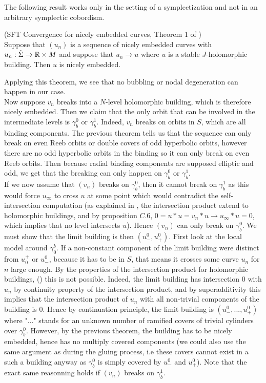 \documentclass[../main.tex]{subfiles}
\begin{document}
\noindent The following result works only in the setting of a symplectization and not in an arbitrary symplectic cobordism.

\begin{theoreme}{(SFT Convergence for nicely embedded curves, Theorem 1 of \cite{wendl_compactness_2008})\\}
    Suppose that $(u_n)$ is a sequence of nicely embedded curves with $u_n : \dot\Sigma \rightarrow \mathbb{R}\times M$ and suppose that $u_n\rightarrow u$ where $u$ is a stable $J$-holomorphic building. Then $u$ is nicely embedded.
\end{theoreme}

Applying this theorem, we see that no bubbling or nodal degeneration can happen in our case. \\

Now suppose $v_n$ breaks into a $N$-level holomorphic building, which is therefore nicely embedded. Then we claim that the only orbit that can be involved in the intermediate levels is $\gamma_b^0$ or $\gamma_b^1$. Indeed, $v_n$ breaks on orbits in $\overline{S}$, which are all binding components. The previous theorem tells us that the sequence can only break on even Reeb orbits or double covers of odd hyperbolic orbits, however there are no odd hyperbolic orbits in the binding so it can only break on even Reeb orbits. Then because radial binding components are supposed elliptic and odd, we get that the breaking can only happen on $\gamma_b^0$ or $\gamma_b^1$. \\

If we now assume that $(v_n)$ breaks on $\gamma_b^0$, then it cannot break on $\gamma_b^1$ as this would force $u_\infty$ to cross $u$ at some point which would contradict the self-intersection computation (as explained in \cite{wendl_contact_2019}, the intersection product extend to holomorphic buildings, and by proposition $C.6$, $0 = u*u = v_n*u\rightarrow u_\infty*u= 0$, which implies that no level intersects $u$). Hence $(v_n)$ can only break on $\gamma_b^0$. We must show that the limit building is then $(u_-^0,u_+^0)$. First look at the local model around $\gamma_0^b$. If a non-constant component of the limit building were distinct from $u_0^+$ or $u_-^0$, because it has to be in $S$, that means it crosses some curve $u_n$ for $n$ large enough. By the properties of the intersection product for holomorphic buildings, (\cite{wendl_contact_2019}) this is not possible. Indeed, the limit building has intersection $0$ with $u_n$ by continuity property of the intersection product, and by superadditivity this implies that the intersection product of $u_n$ with all non-trivial components of the building is $0$. Hence by continuation principle, the limit building is $(u_-^0, ..., u_+^0)$ where "..." stands for an unknown number of ramified covers of trivial cylinders over $\gamma_b^0$. However, by the previous theorem, the building has to be nicely embedded, hence has no multiply covered components (we could also use the same argument as during the gluing process, i.e these covers cannot exist in a such a building anyway as $\gamma_b^0$ is simply covered by $u_-^0$ and $u_+^0$). Note that the exact same reasonning holds if $(v_n)$ breaks on $\gamma_b^1$. \\
\end{document}
